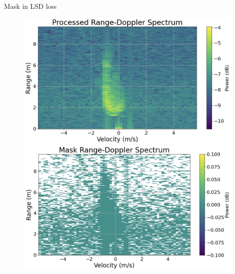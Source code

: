 \documentclass{beamer}
\begin{document}
\begin{frame}{Mask in LSD loss}
    \begin{figure}
        \centering

        \begin{minipage}{0.48\textwidth}
            \centering
            \includegraphics[width=\textwidth]{MA_presentation/figures/gt_logamp.png}
        \end{minipage}
        \hfill
        \begin{minipage}{0.48\textwidth}
            \centering
            \includegraphics[width=\textwidth]{MA_presentation/figures/mask.png}
        \end{minipage}

        \vspace{0.1cm}


\end{figure}
\end{frame}
\end{document}
